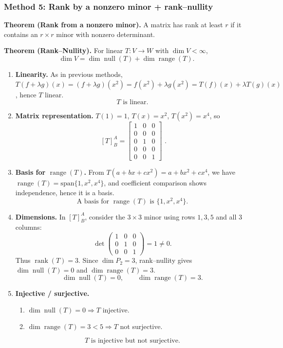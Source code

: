 \documentclass[12pt]{article}
\let\amsboxed\boxed
\renewcommand{\boxed}[1]{\amsboxed{\,#1\,}}
\begin{document}
\subsubsection{Method 5: Rank by a nonzero minor + rank--nullity}
\textbf{Theorem (Rank from a nonzero minor).}
A matrix has rank at least $r$ if it contains an $r\times r$ minor with nonzero determinant.

\textbf{Theorem (Rank--Nullity).}
For linear $T:V\to W$ with $\dim V<\infty$,
\[
\dim V=\dim\operatorname{null}(T)+\dim\operatorname{range}(T).
\]

\begin{enumerate}[label=(\alph*)]
\item \textbf{Linearity.}
As in previous methods, $T(f+\lambda g)(x)=(f+\lambda g)(x^2)=f(x^2)+\lambda g(x^2)=T(f)(x)+\lambda T(g)(x)$, hence $T$ linear.
\[
\boxed{\,T\text{ is linear.}\,}
\]

\item \textbf{Matrix representation.}
$T(1)=1$, $T(x)=x^2$, $T(x^2)=x^4$, so
\[
\boxed{\, [T]_{B}^{A}=
\begin{bmatrix}
1&0&0\\
0&0&0\\
0&1&0\\
0&0&0\\
0&0&1
\end{bmatrix}\,}.
\]

\item \textbf{Basis for $\operatorname{range}(T)$.}
From $T(a+bx+cx^2)=a+bx^2+cx^4$, we have $\operatorname{range}(T)=\mathrm{span}\{1,x^2,x^4\}$, and coefficient comparison shows independence, hence it is a basis.
\[
\boxed{\,\text{A basis for }\operatorname{range}(T)\text{ is }\{1,x^2,x^4\}.\,}
\]

\item \textbf{Dimensions.}
In $[T]_B^A$, consider the $3\times 3$ minor using rows $1,3,5$ and all $3$ columns:
\[
\det\!\begin{pmatrix}
1&0&0\\
0&1&0\\
0&0&1
\end{pmatrix}=1\neq 0.
\]
Thus $\operatorname{rank}(T)=3$. Since $\dim P_2=3$, rank--nullity gives $\dim\operatorname{null}(T)=0$ and $\dim\operatorname{range}(T)=3$.
\[
\boxed{\,\dim\operatorname{null}(T)=0,\qquad \dim\operatorname{range}(T)=3.\,}
\]

\item \textbf{Injective / surjective.}
\begin{enumerate}[label=(\roman*)]
\item $\dim\operatorname{null}(T)=0\Rightarrow T$ injective.
\item $\dim\operatorname{range}(T)=3<5\Rightarrow T$ not surjective.
\end{enumerate}
\[
\boxed{\,T\text{ is injective but not surjective.}\,}
\]
\end{enumerate}
\newpage
\end{document}
